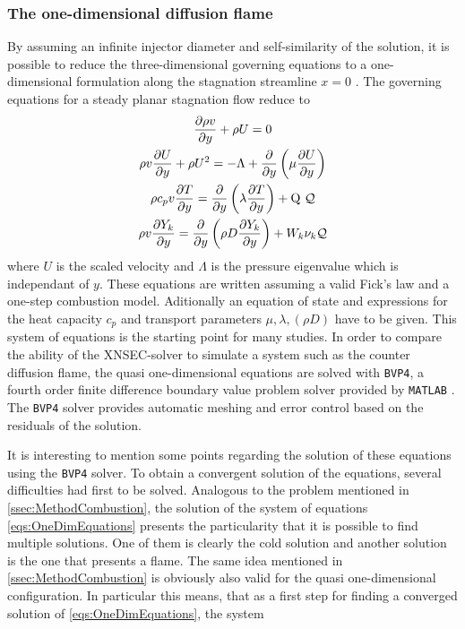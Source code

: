 \subsubsection{The one-dimensional diffusion flame}
By assuming an infinite injector diameter and self-similarity of the solution, it is possible to reduce the three-dimensional governing equations to a one-dimensional formulation along the stagnation streamline $x = 0$ \citep{keeChemicallyReactingFlow2003}. The governing equations for a steady planar stagnation flow reduce to
\begin{gather}
	\frac{\partial\rho v}{\partial y} +  \rho U = 0\\ \label{eq:OneDimCont}%
	\rho v \frac{\partial U}{\partial y} + \rho U^2 =
	- \Lambda
	+ \frac{\partial}{\partial y}\left(\mu \frac{\partial U}{\partial y}\right)\\ \label{eq:OneDimMom}%
	\rho c_p v \frac{\partial T}{\partial y} =
	\frac{\partial}{\partial y}\left(\lambda \frac{\partial T}{\partial y}\right)
	+\heatRelease~\mathcal{Q}\\
	\rho v \frac{\partial Y_k}{\partial y} = 
	\frac{\partial}{\partial y}\left(\rho D \frac{\partial Y_k}{\partial y}\right)
	+ W_k \stoicCoef_k \mathcal{Q}
\end{gather}\label{eqs:OneDimEquations}
where $U$ is the scaled velocity and $\Lambda$ is the pressure eigenvalue which is independant of $y$. These equations are written assuming a valid Fick's law and a one-step combustion model. Aditionally an equation of state and expressions for the heat capacity $c_p$ and transport parameters $\mu, \lambda, (\rho D)$ have to be given. This system of equations is the starting point for many studies. In order to compare the ability of the XNSEC-solver to simulate a system such as the counter diffusion flame, the quasi one-dimensional equations are solved with \lstinline|BVP4|, a fourth order finite difference boundary value problem solver provided by \lstinline|MATLAB| \citep{kierzenkaBVPSolverBased2001}. The  \lstinline|BVP4| solver provides automatic meshing and error control based on the residuals of the solution. 

It is interesting to mention some points regarding the solution of these equations using the \lstinline|BVP4| solver. To obtain a convergent solution of the equations, several difficulties had first to be solved. Analogous to the problem mentioned in \cref{ssec:MethodCombustion}, the solution of the system of equations \cref{eqs:OneDimEquations} presents the particularity that it is possible to find multiple solutions. One of them is clearly the cold solution and another solution is the one that presents a flame. The same idea mentioned in  \cref{ssec:MethodCombustion} is obviously also valid for the quasi one-dimensional configuration. In particular this means, that as a first step for finding a converged solution of \cref{eqs:OneDimEquations},  the system

